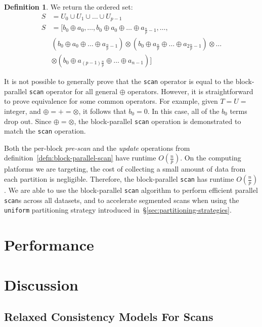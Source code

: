 \documentclass[preprint]{sigplanconf}
\theoremstyle{definition}
\newtheorem{defn}{Definition}
\begin{document}
\begin{defn}
We return the ordered set:
\begin{equation*}
\begin{split}
S &=U_0 \cup U_1 \cup \ldots \cup U_{p - 1} \\
S &= [b_0 \oplus a_0, \ldots, b_0 \oplus a_0 \oplus \ldots \oplus a_{\frac{n}{p} - 1}, \ldots, \\
 &(b_0 \oplus
a_0 \oplus \ldots \oplus a_{\frac{n}{p} - 1}) \otimes (b_0 \oplus a_{\frac{n}{p}} \oplus \ldots \oplus
a_{2\frac{n}{p} - 1}) \otimes \ldots \\
& \otimes (b_0 \oplus a_{(p - 1)\frac{n}{p}} \oplus \ldots \oplus a_{n - 1})]
\end{split}
\end{equation*}
\end{defn}

It is not possible to generally prove that the \texttt{scan} operator is equal to the block-parallel
\texttt{scan} operator for all general $\oplus$ operators. However, it is straightforward to prove
equivalence for some common operators. For example, given $T = U =$ integer, and $\oplus = +
= \otimes$, it follows that $b_0 = 0$. In this case, all of the $b_0$ terms drop out. Since $\oplus =
\otimes$, the block-parallel \texttt{scan} operation is demonstrated to match the \texttt{scan} operation.

Both the per-block \emph{pre-scan} and the \emph{update} operations from
definition~\ref{defn:block-parallel-scan} have runtime $O(\frac{n}{p})$. On the computing platforms we
are targeting, the cost of collecting a small amount of data from each partition is negligible. Therefore,
the block-parallel \texttt{scan} has runtime $O(\frac{n}{p})$. We are able to use the block-parallel
\texttt{scan} algorithm to perform efficient parallel \texttt{scan}s across all datasets, and to accelerate
segmented scans when using the \texttt{uniform} partitioning strategy introduced
in~\S\ref{sec:partitioning-strategies}.

\section{Performance}
\label{sec:performance}

\section{Discussion}
\label{sec:discussion}

\subsection{Relaxed Consistency Models For Scans}
\label{sec:relaxed-scans}
\end{document}
